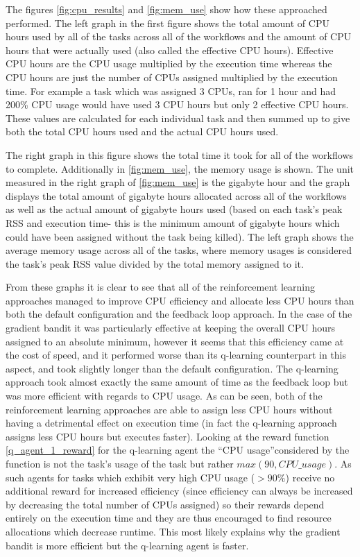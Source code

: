 The figures \ref{fig:cpu_results} and \ref{fig:mem_use} show how these approached performed. The left graph in the first figure shows the total amount of CPU hours used by all of the tasks across all of the workflows and the amount of CPU hours that were actually used (also called the effective CPU hours). Effective CPU hours are the CPU usage multiplied by the execution time whereas the CPU hours are just the number of CPUs assigned multiplied by the execution time. For example a task which was assigned 3 CPUs, ran for 1 hour and had 200\% CPU usage would have used 3 CPU hours but only 2 effective CPU hours. These values are calculated for each individual task and then summed up to give both the total CPU hours used and the actual CPU hours used.

The right graph in this figure shows the total time it took for all of the workflows to complete. Additionally in \ref{fig:mem_use}, the memory usage is shown. The unit measured in the right graph of \ref{fig:mem_use} is the gigabyte hour and the graph displays the total amount of gigabyte hours allocated across all of the workflows as well as the actual amount of gigabyte hours used (based on each task’s peak RSS and execution time- this is the minimum amount of gigabyte hours which could have been assigned without the task being killed). The left graph shows the average memory usage across all of the tasks, where memory usages is considered the task’s peak RSS value divided by the total memory assigned to it. 

From these graphs it is clear to see that all of the reinforcement learning approaches managed to improve CPU efficiency and allocate less CPU hours than both the default configuration and the feedback loop approach. In the case of the gradient bandit it was particularly effective at keeping the overall CPU hours assigned to an absolute minimum, however it seems that this efficiency came at the cost of speed, and it performed worse than its q-learning counterpart in this aspect, and took slightly longer than the default configuration. The q-learning approach took almost exactly the same amount of time as the feedback loop but was more efficient with regards to CPU usage. As can be seen, both of the reinforcement learning approaches are able to assign less CPU hours without having a detrimental effect on execution time (in fact the q-learning approach assigns less CPU hours but executes faster). Looking at the reward function \ref{q_agent_1_reward} for the q-learning agent the “CPU usage”considered by the function is not the task’s usage of the task but rather $max(90,CPU\_usage)$. As such agents for tasks which exhibit very high CPU usage ($>90\%$) receive no additional reward for increased efficiency (since efficiency can always be increased by decreasing the total number of CPUs assigned) so their rewards depend entirely on the execution time and they are thus encouraged to find resource allocations which decrease runtime. This most likely explains why the gradient bandit is more efficient but the q-learning agent is faster.

